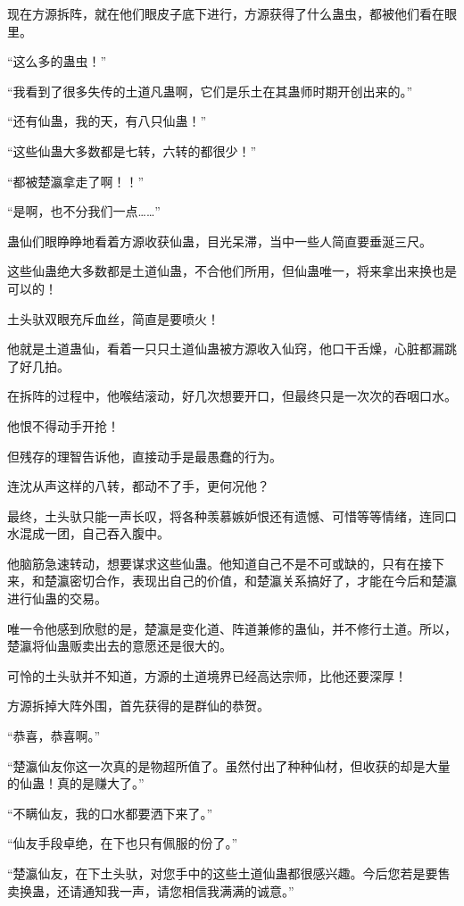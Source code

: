 \begin{this_body}
现在方源拆阵，就在他们眼皮子底下进行，方源获得了什么蛊虫，都被他们看在眼里。

“这么多的蛊虫！”

“我看到了很多失传的土道凡蛊啊，它们是乐土在其蛊师时期开创出来的。”

“还有仙蛊，我的天，有八只仙蛊！”

“这些仙蛊大多数都是七转，六转的都很少！”

“都被楚瀛拿走了啊！！”

“是啊，也不分我们一点……”

蛊仙们眼睁睁地看着方源收获仙蛊，目光呆滞，当中一些人简直要垂涎三尺。

这些仙蛊绝大多数都是土道仙蛊，不合他们所用，但仙蛊唯一，将来拿出来换也是可以的！

土头驮双眼充斥血丝，简直是要喷火！

他就是土道蛊仙，看着一只只土道仙蛊被方源收入仙窍，他口干舌燥，心脏都漏跳了好几拍。

在拆阵的过程中，他喉结滚动，好几次想要开口，但最终只是一次次的吞咽口水。

他恨不得动手开抢！

但残存的理智告诉他，直接动手是最愚蠢的行为。

连沈从声这样的八转，都动不了手，更何况他？

最终，土头驮只能一声长叹，将各种羡慕嫉妒恨还有遗憾、可惜等等情绪，连同口水混成一团，自己吞入腹中。

他脑筋急速转动，想要谋求这些仙蛊。他知道自己不是不可或缺的，只有在接下来，和楚瀛密切合作，表现出自己的价值，和楚瀛关系搞好了，才能在今后和楚瀛进行仙蛊的交易。

唯一令他感到欣慰的是，楚瀛是变化道、阵道兼修的蛊仙，并不修行土道。所以，楚瀛将仙蛊贩卖出去的意愿还是很大的。

可怜的土头驮并不知道，方源的土道境界已经高达宗师，比他还要深厚！

方源拆掉大阵外围，首先获得的是群仙的恭贺。

“恭喜，恭喜啊。”

“楚瀛仙友你这一次真的是物超所值了。虽然付出了种种仙材，但收获的却是大量的仙蛊！真的是赚大了。”

“不瞒仙友，我的口水都要洒下来了。”

“仙友手段卓绝，在下也只有佩服的份了。”

“楚瀛仙友，在下土头驮，对您手中的这些土道仙蛊都很感兴趣。今后您若是要售卖换蛊，还请通知我一声，请您相信我满满的诚意。”


\end{this_body}
